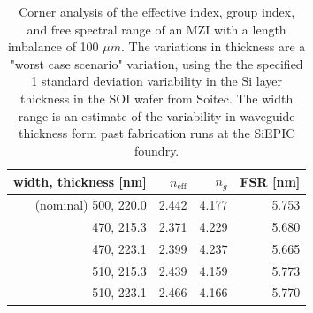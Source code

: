 \documentclass[journal]{IEEEtran}
\begin{document}
\begin{table}
\centering
\begin{tabular}{ r | r | r | r }
  \hline
  width, thickness [nm] & $n_{\text{eff}}$ & $n_g$ & FSR [nm] \\
  \hline
  (nominal) 500, 220.0  & 2.442            & 4.177 & 5.753  \\
  470, 215.3            & 2.371            & 4.229 & 5.680  \\
  470, 223.1            & 2.399            & 4.237 & 5.665  \\
  510, 215.3            & 2.439            & 4.159 & 5.773  \\
  510, 223.1            & 2.466            & 4.166 & 5.770  \\
\end{tabular}
\caption{Corner analysis of the effective index, group index, and free spectral range of an MZI with a length imbalance of 100 $\mu m$. The variations in thickness are a "worst case scenario" variation, using the the specified 1 standard deviation variability in the Si layer thickness in the SOI wafer from Soitec. The width range is an estimate of the variability in waveguide thickness form past fabrication runs at the SiEPIC foundry.}
\label{tab:corner}
\end{table}


% 




\end{document}
